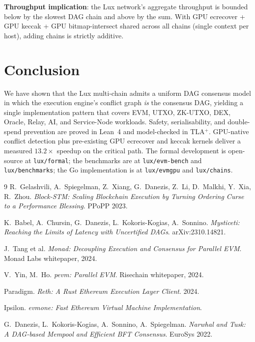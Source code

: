 \documentclass[11pt]{article}
\theoremstyle{definition}
\begin{document}
\textbf{Throughput implication}: the Lux network's aggregate throughput is
bounded below by the slowest DAG chain and above by the sum. With GPU
ecrecover + GPU keccak + GPU bitmap-intersect shared across all chains
(single context per host), adding chains is strictly additive.

\section{Conclusion}

We have shown that the Lux multi-chain admits a uniform DAG consensus
model in which the execution engine's conflict graph \emph{is} the
consensus DAG, yielding a single implementation pattern that covers EVM,
UTXO, ZK-UTXO, DEX, Oracle, Relay, AI, and Service-Node workloads. Safety,
serialisability, and double-spend prevention are proved in Lean~4 and
model-checked in TLA$^+$. GPU-native conflict detection plus pre-existing
GPU ecrecover and keccak kernels deliver a measured $13.2\times$ speedup
on the critical path. The formal development is open-source at
\texttt{lux/formal}; the benchmarks are at \texttt{lux/evm-bench} and
\texttt{lux/benchmarks}; the Go implementation is at \texttt{lux/evmgpu}
and \texttt{lux/chains}.

\begin{thebibliography}{9}
R.~Gelashvili, A.~Spiegelman, Z.~Xiang, G.~Danezis, Z.~Li, D.~Malkhi,
Y.~Xia, R.~Zhou.
\emph{Block-STM: Scaling Blockchain Execution by Turning Ordering Curse to
a Performance Blessing}. PPoPP 2023.

K.~Babel, A.~Chursin, G.~Danezis, L.~Kokoris-Kogias, A.~Sonnino.
\emph{Mysticeti: Reaching the Limits of Latency with Uncertified DAGs}.
arXiv:2310.14821.

J.~Tang et al.
\emph{Monad: Decoupling Execution and Consensus for Parallel EVM}.
Monad Labs whitepaper, 2024.

V.~Yin, M.~Ho.
\emph{pevm: Parallel EVM}.
Risechain whitepaper, 2024.

Paradigm. \emph{Reth: A Rust Ethereum Execution Layer Client}. 2024.

Ipsilon. \emph{evmone: Fast Ethereum Virtual Machine Implementation}.

G.~Danezis, L.~Kokoris-Kogias, A.~Sonnino, A.~Spiegelman.
\emph{Narwhal and Tusk: A DAG-based Mempool and Efficient BFT Consensus}.
EuroSys 2022.
\end{thebibliography}
\end{document}
